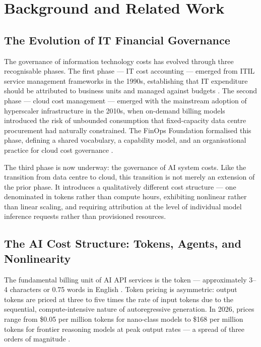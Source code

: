 \documentclass[11pt,twocolumn]{article}
\begin{document}
\section{Background and Related Work}
\label{sec:background}

\subsection{The Evolution of IT Financial Governance}

The governance of information technology costs has evolved through three
recognisable phases. The first phase --- IT cost accounting --- emerged from
ITIL service management frameworks in the 1990s, establishing that IT
expenditure should be attributed to business units and managed against budgets
\citep{itilv4}. The second phase --- cloud cost management --- emerged with
the mainstream adoption of hyperscaler infrastructure in the 2010s, when
on-demand billing models introduced the risk of unbounded consumption that
fixed-capacity data centre procurement had naturally constrained. The FinOps
Foundation formalised this phase, defining a shared vocabulary, a capability
model, and an organisational practice for cloud cost governance
\citep{finopsfoundation2023}.

The third phase is now underway: the governance of AI system costs. Like the
transition from data centre to cloud, this transition is not merely an extension
of the prior phase. It introduces a qualitatively different cost structure
--- one denominated in tokens rather than compute hours, exhibiting nonlinear
rather than linear scaling, and requiring attribution at the level of individual
model inference requests rather than provisioned resources.

\subsection{The AI Cost Structure: Tokens, Agents, and Nonlinearity}

The fundamental billing unit of AI API services is the token --- approximately
3--4 characters or 0.75 words in English \citep{openai2024}. Token pricing is
asymmetric: output tokens are priced at three to five times the rate of input
tokens due to the sequential, compute-intensive nature of autoregressive
generation. In 2026, prices range from \$0.05 per million tokens for nano-class
models to \$168 per million tokens for frontier reasoning models at peak output
rates --- a spread of three orders of magnitude \citep{introl2025}.
\end{document}
